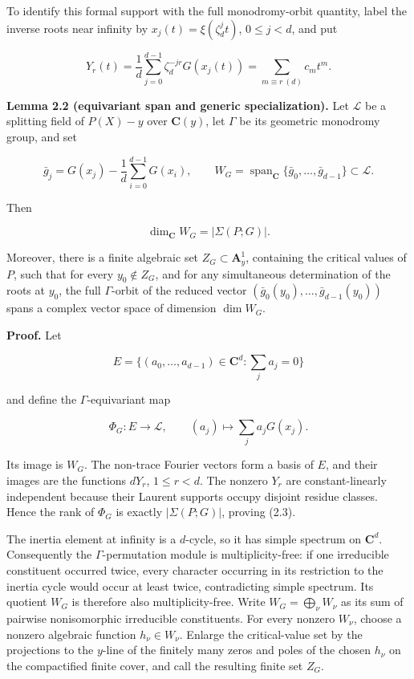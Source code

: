 \documentclass[
  11pt,
  a4paper,
]{amsart}
\begin{document}
To identify this formal support with the full monodromy-orbit quantity,
label the inverse roots near infinity by \(x_j(t)=\xi(\zeta_d^jt)\),
\(0\le j<d\), and put

\[
Y_r(t)=\frac1d\sum_{j=0}^{d-1}
\zeta_d^{-jr}G(x_j(t))
=\sum_{m\equiv r\ (d)}c_mt^m.
\]

\textbf{Lemma 2.2 (equivariant span and generic specialization).} Let
\(\mathcal L\) be a splitting field of \(P(X)-y\) over \(\mathbf C(y)\),
let \(\Gamma\) be its geometric monodromy group, and set

\[
\bar g_j=G(x_j)-\frac1d\sum_{i=0}^{d-1}G(x_i),\qquad
W_G=\operatorname{span}_{\mathbf C}\{\bar g_0,\ldots,\bar g_{d-1}\}
\subset\mathcal L.
\]

Then

\[
\dim_{\mathbf C}W_G=|\Sigma(P;G)|.                       \tag{2.3}
\]

Moreover, there is a finite algebraic set \(Z_G\subset\mathbf A^1_y\),
containing the critical values of \(P\), such that for every
\(y_0\notin Z_G\), and for any simultaneous determination of the roots
at \(y_0\), the full \(\Gamma\)-orbit of the reduced vector
\((\bar g_0(y_0),\ldots,\bar g_{d-1}(y_0))\) spans a complex vector
space of dimension \(\dim W_G\).

\textbf{Proof.} Let

\[
E=\{(a_0,\ldots,a_{d-1})\in\mathbf C^d:\sum_ja_j=0\}
\]

and define the \(\Gamma\)-equivariant map

\[
\Phi_G:E\longrightarrow\mathcal L,\qquad
(a_j)\longmapsto\sum_ja_jG(x_j).
\]

Its image is \(W_G\). The non-trace Fourier vectors form a basis of
\(E\), and their images are the functions \(dY_r\), \(1\le r<d\). The
nonzero \(Y_r\) are constant-linearly independent because their Laurent
supports occupy disjoint residue classes. Hence the rank of \(\Phi_G\)
is exactly \(|\Sigma(P;G)|\), proving (2.3).

The inertia element at infinity is a \(d\)-cycle, so it has simple
spectrum on \(\mathbf C^d\). Consequently the \(\Gamma\)-permutation
module is multiplicity-free: if one irreducible constituent occurred
twice, every character occurring in its restriction to the inertia cycle
would occur at least twice, contradicting simple spectrum. Its quotient
\(W_G\) is therefore also multiplicity-free. Write
\(W_G=\bigoplus_\nu W_\nu\) as its sum of pairwise nonisomorphic
irreducible constituents. For every nonzero \(W_\nu\), choose a nonzero
algebraic function \(h_\nu\in W_\nu\). Enlarge the critical-value set by
the projections to the \(y\)-line of the finitely many zeros and poles
of the chosen \(h_\nu\) on the compactified finite cover, and call the
resulting finite set \(Z_G\).
\end{document}
